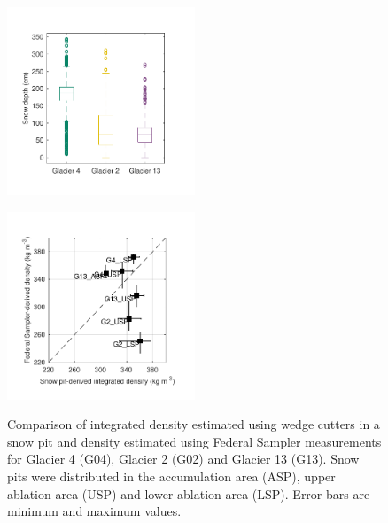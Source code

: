 \documentclass[twocolumn,letterpaper]{igs}
\begin{document}
\begin{figure}
	\centering
	\includegraphics[width =0.5\textwidth]{DepthBoxplot.pdf}\\
	\caption{}
	\label{fig:DepthBoxplot}
\end{figure}

\begin{figure}
	\centering
	\includegraphics[width =0.5\textwidth]{SPvsFS.pdf}\\
	\caption{Comparison of integrated density estimated using wedge cutters in a snow pit and density estimated using Federal Sampler measurements for Glacier 4 (G04), Glacier 2 (G02) and Glacier 13 (G13). Snow pits were distributed in the accumulation area (ASP), upper ablation area (USP) and lower ablation area (LSP). Error bars are minimum and maximum values.}
	\label{fig:density_pitVStube}
\end{figure}
\end{document}
